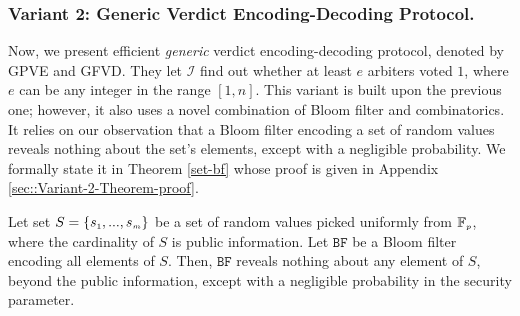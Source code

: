 \subsubsection{Variant 2: Generic Verdict  Encoding-Decoding Protocol.} Now, we present   efficient \emph{generic} verdict  encoding-decoding protocol, denoted by GPVE and GFVD. They   let $\mathcal{I}$ find out whether at least $e$ arbiters voted $1$, where $e$ can be any integer in the range $[1, n]$. This variant is  built upon the previous one;  however, it also uses a novel combination of   Bloom filter and combinatorics. It  relies on our observation that a Bloom filter  encoding a set of random values reveals nothing about the set's elements, except with a negligible probability. We formally state it in Theorem \ref{set-bf} whose proof is given in Appendix \ref{sec::Variant-2-Theorem-proof}. 




\begin{theorem}\label{set-bf}
Let set $S=\{s_{\scriptscriptstyle 1},..., s_{\scriptscriptstyle m}\}$ be a set of random values picked uniformly from $\mathbb{F}_{\scriptscriptstyle p}$, where the cardinality of $S$ is  public information. Let $\mathtt{BF}$ be a Bloom filter encoding all elements of   $S$. Then,  $\mathtt{BF}$ reveals nothing about any element of $S$, beyond the public information, except with a negligible probability in the security parameter. 
\end{theorem}

%
%



